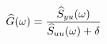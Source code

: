 \documentclass[preview]{standalone}
\begin{document}
\begin{align*}
\special{dvisvgm:raw <g id='unique000'>}\widehat{G}(\omega)=\frac{\widehat{S}_{yu}(\omega)}{\widehat{S}_{uu}(\omega)+\delta}\special{dvisvgm:raw </g>}
\end{align*}
\end{document}

